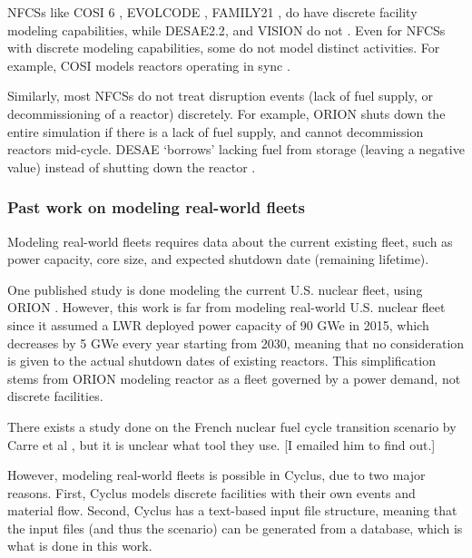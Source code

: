\glspl{NFCS} like COSI 6 \cite{meyer_new_2009}, EVOLCODE \cite{alvaerz-velarde_validation_2014},
FAMILY21 \cite{oecd_nuclear_2009},
do have discrete facility modeling capabilities, while
DESAE2.2\cite{tsibulskiy_desae_2006}, and VISION \cite{jacobson_verifiable_2010} do
not \cite{boucher_international_2010}. Even for \glspl{NFCS} with discrete modeling
capabilities, some do not model distinct activities. For example, COSI models
reactors operating in sync \cite{boucher_benchmark_2012}.

Similarly, most \glspl{NFCS} do not treat disruption events (lack of fuel supply,
or decommissioning of a reactor)
discretely. For example, ORION shuts down the entire simulation if there
is a lack of fuel supply, and cannot decommission reactors mid-cycle.
DESAE `borrows' lacking fuel from storage (leaving a
negative value) instead of shutting down the reactor \cite{mccarthy_benchmark_2012}.

\subsubsection{Past work on modeling real-world fleets}
Modeling real-world fleets requires data about the current existing fleet,
such as power capacity, core size, and expected shutdown date (remaining lifetime).

One published study is done modeling the current U.S. nuclear fleet,
using ORION \cite{sunny_transition_2015}. However, this work is far from
modeling real-world U.S. nuclear fleet since it assumed a \gls{LWR} deployed power capacity
of 90 GWe in 2015, which decreases by 5 GWe every year starting from 2030,
meaning that no consideration is given to the actual shutdown dates of
existing reactors. This simplification stems from ORION modeling reactor as
a fleet governed by a power demand, not discrete facilities.

There exists a study done on the French nuclear fuel cycle transition scenario
by Carre et al \cite{carre_overview_2009}, but it is unclear what tool they use.
[I emailed him to find out.]

However, modeling real-world fleets is possible in Cyclus, due to two major
reasons. First, Cyclus models
discrete facilities with their own events and material flow.
Second, Cyclus has a text-based input file structure, meaning that
the input files (and thus the scenario) can be generated from 
a database, which is what is done in this work.

